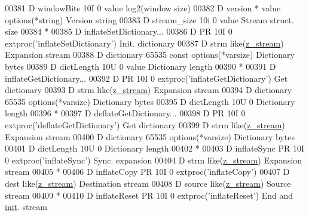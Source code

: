 \begin{DoxyCode}
00381      D  windowBits                   10I 0 value                                log2(window size)
00382      D  version                        *   value options(*\textcolor{keywordtype}{string})               Version \textcolor{keywordtype}{string}
00383      D  stream\_size                  10i 0 value                                Stream struct. size
00384       *
00385      D inflateSetDictionary...
00386      D                 PR            10I 0 extproc('inflateSetDictionary')      Init. dictionary
00387      D  strm                               like(\hyperlink{structz__stream__s}{z\_stream})                       Expansion stream
00388      D  dictionary                65535    const options(*varsize)              Dictionary bytes
00389      D  dictLength                   10U 0 value                                Dictionary length
00390       *
00391      D inflateGetDictionary...
00392      D                 PR            10I 0 extproc('inflateGetDictionary')      Get dictionary
00393      D  strm                               like(\hyperlink{structz__stream__s}{z\_stream})                       Expansion stream
00394      D  dictionary                65535    options(*varsize)                    Dictionary bytes
00395      D  dictLength                   10U 0                                      Dictionary length
00396       *
00397      D deflateGetDictionary...
00398      D                 PR            10I 0 extproc('deflateGetDictionary')      Get dictionary
00399      D  strm                               like(\hyperlink{structz__stream__s}{z\_stream})                       Expansion stream
00400      D  dictionary                65535    options(*varsize)                    Dictionary bytes
00401      D  dictLength                   10U 0                                      Dictionary length
00402       *
00403      D inflateSync     PR            10I 0 extproc('inflateSync')               Sync. expansion
00404      D  strm                               like(\hyperlink{structz__stream__s}{z\_stream})                       Expansion stream
00405       *
00406      D inflateCopy     PR            10I 0 extproc('inflateCopy')
00407      D  dest                               like(\hyperlink{structz__stream__s}{z\_stream})                       Destination stream
00408      D  source                             like(\hyperlink{structz__stream__s}{z\_stream})                       Source stream
00409       *
00410      D inflateReset    PR            10I 0 extproc('inflateReset')              End and 
      \hyperlink{structinit}{init}. stream

\end{DoxyCode}
